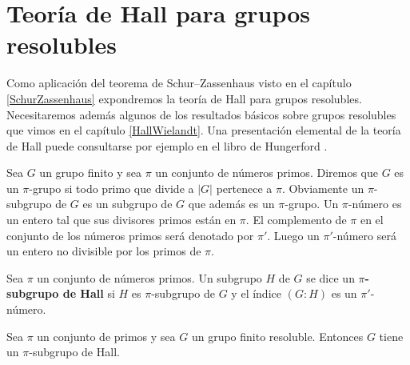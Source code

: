 \chapter{Teoría de Hall para grupos resolubles}
\label{Hall}

Como aplicación del teorema de Schur--Zassenhaus visto en el capítulo \ref{SchurZassenhaus} 
expondremos la teoría de Hall para grupos resolubles. Necesitaremos además 
algunos de los resultados básicos sobre grupos resolubles que vimos en el capítulo 
\ref{HallWielandt}. 
Una presentación elemental
de la teoría de Hall puede consultarse por ejemplo 
en el libro de Hungerford \cite{MR600654}. 

\medskip

Sea $G$ un grupo finito y sea $\pi$ un conjunto de números primos. Diremos que
$G$ es un $\pi$-grupo si todo primo que divide a $|G|$ pertenece a $\pi$.
Obviamente un $\pi$-subgrupo de $G$ es un subgrupo de $G$ que además es un
$\pi$-grupo. Un $\pi$-número es un entero tal que sus divisores primos están en
$\pi$. El complemento de $\pi$ en el conjunto de los números primos será
denotado por $\pi'$. Luego un $\pi'$-número será un entero no divisible por los
primos de $\pi$.

\begin{definition}
	Sea $\pi$ un conjunto de números primos. Un subgrupo $H$ de $G$ se dice un
	\textbf{$\pi$-subgrupo de Hall} si $H$ es $\pi$-subgrupo de $G$ y el índice $(G:H)$
	es un $\pi'$-número.
\end{definition}

\begin{theorem}[Hall]
	\label{theorem:HallE}
	Sea $\pi$ un conjunto de primos y sea $G$ un grupo finito resoluble. Entonces
	$G$ tiene un $\pi$-subgrupo de Hall.
\end{theorem}

